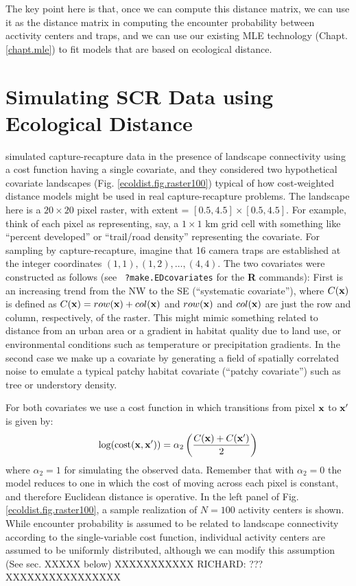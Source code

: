 The key point here is that, once we can compute this distance matrix,
we can use it as the distance matrix in computing the encounter
probability between acctivity centers and traps, and we can use our
existing MLE technology (Chapt. \ref{chapt.mle}) to fit models that
are based on ecological distance. 



\section{Simulating SCR Data using Ecological Distance}
\label{ecoldist.sec.simulating}

\citet{royle_etal:2012ecol} simulated capture-recapture data in the
presence of landscape connectivity using a cost function having a
single covariate, and they considered two hypothetical covariate
landscapes 
(Fig. \ref{ecoldist.fig.raster100})
typical of how
cost-weighted distance models might be used in real capture-recapture
problems.  The landscape here is
 a $20 \times 20$ pixel raster, with 
extent = $[0.5, 4.5] \times [0.5, 4.5]$. 
For example, think of each pixel as
representing, say, a $1 \times 1$ km grid cell with something like
``percent developed'' or ``trail/road density'' representing the
covariate. For sampling by capture-recapture, imagine 
that 16 camera traps are established at the integer coordinates
$(1,1), (1,2), \ldots, (4,4)$. 
The two covariates were constructed as follows (see \mbox{\tt
  ?make.EDcovariates} for the {\bf R} commands):
First is an increasing trend from
the NW to the SE (``systematic covariate''), where $C({\bf x})$ is defined as
$C({\bf x}) = row({\bf x}) + col({\bf x})$ and $row({\bf x})$ and $col({\bf x})$ are just the row and
column, respectively, of the raster.  This might mimic something
related to distance from an urban area or a gradient in habitat
quality due to land use, or environmental conditions such as
temperature or precipitation gradients.  In the second case we make up
a covariate by generating a field of spatially correlated noise to
emulate a typical patchy habitat covariate (``patchy covariate'') such as
tree or understory density. 

For both covariates we use a
cost function in which transitions from pixel ${\bf x}$ to ${\bf x}'$
is given by:
\[
 \log(\mbox{cost}({\bf x},{\bf x}'))=  \alpha_2 \left( \frac{C({\bf
       x}) + C({\bf x}')}{2} \right)
\]
where $\alpha_2 = 1$ for simulating the observed data.
 Remember that with $\alpha_2=0$ the
model reduces to one in which the cost of moving across each pixel is
constant, and therefore Euclidean distance is operative.
In the left panel of 
Fig. \ref{ecoldist.fig.raster100}, a sample realization of
$N=100$ activity centers is shown. While encounter probability is
assumed to be related to landscape connectivity according to the
single-variable cost function, individual activity centers are 
assumed to be uniformly distributed, although we can modify this
assumption (See sec. XXXXX below) XXXXXXXXXXX RICHARD: ??? XXXXXXXXXXXXXXXX


